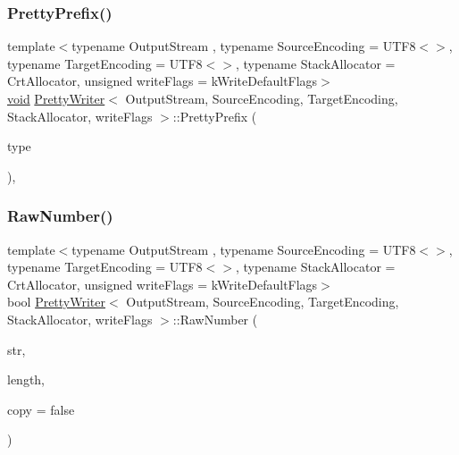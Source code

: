 \subsubsection{\texorpdfstring{Pretty\+Prefix()}{PrettyPrefix()}}
{\footnotesize\ttfamily template$<$typename Output\+Stream , typename Source\+Encoding  = U\+T\+F8$<$$>$, typename Target\+Encoding  = U\+T\+F8$<$$>$, typename Stack\+Allocator  = Crt\+Allocator, unsigned write\+Flags = k\+Write\+Default\+Flags$>$ \\
\hyperlink{imgui__impl__opengl3__loader_8h_ac668e7cffd9e2e9cfee428b9b2f34fa7}{void} \hyperlink{classPrettyWriter}{Pretty\+Writer}$<$ Output\+Stream, Source\+Encoding, Target\+Encoding, Stack\+Allocator, write\+Flags $>$\+::Pretty\+Prefix (\begin{DoxyParamCaption}\item[{\hyperlink{rapidjson_8h_a1d1cfd8ffb84e947f82999c682b666a7}{Type}}]{type }\end{DoxyParamCaption})\hspace{0.3cm}{\ttfamily [inline]}, {\ttfamily [protected]}}

\mbox{\label{classPrettyWriter_a3941bc21d6a261ca8a86eff330db30ef}} 
\subsubsection{\texorpdfstring{Raw\+Number()}{RawNumber()}}
{\footnotesize\ttfamily template$<$typename Output\+Stream , typename Source\+Encoding  = U\+T\+F8$<$$>$, typename Target\+Encoding  = U\+T\+F8$<$$>$, typename Stack\+Allocator  = Crt\+Allocator, unsigned write\+Flags = k\+Write\+Default\+Flags$>$ \\
bool \hyperlink{classPrettyWriter}{Pretty\+Writer}$<$ Output\+Stream, Source\+Encoding, Target\+Encoding, Stack\+Allocator, write\+Flags $>$\+::Raw\+Number (\begin{DoxyParamCaption}\item[{const \hyperlink{classPrettyWriter_ae35c89bda4c5d59d3ff6efcf2fea45a3}{Ch} $\ast$}]{str,  }\item[{\hyperlink{rapidjson_8h_a5ed6e6e67250fadbd041127e6386dcb5}{Size\+Type}}]{length,  }\item[{bool}]{copy = {\ttfamily false} }\end{DoxyParamCaption})\hspace{0.3cm}{\ttfamily [inline]}}

